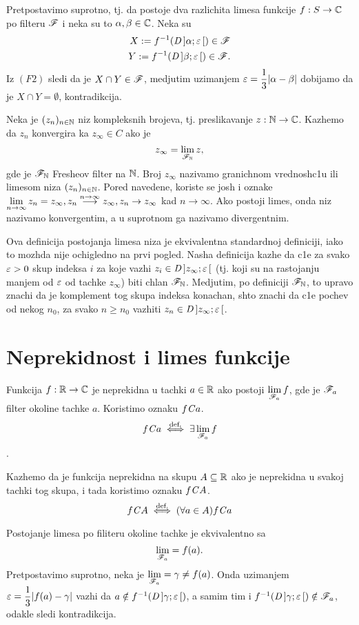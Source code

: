 \documentclass[../main_og.tex]{subfiles}
\begin{document}
    \dok Pretpostavimo suprotno, tj. da postoje dva razlichita limesa funkcije $f:S\to \mathbb{C}$ po filteru $\mathscr{F}$  i neka su to $\alpha, \beta \in \mathbb{C}$. Neka su 
    \begin{align*}
        X:= f^{-1}(\mathit{D}\,]\alpha;\varepsilon\,[) \in \mathscr{F}\\
        Y:= f^{-1}(\mathit{D}\,]\beta;\varepsilon\,[) \in \mathscr{F}.
    \end{align*}
    Iz $(F2)$ sledi da je $X\cap Y\in \mathscr{F}$, medjutim uzimanjem $\varepsilon=\dfrac{1}{3}|\alpha-\beta|$ dobijamo da je $X\cap Y=\emptyset$, kontradikcija.

    Neka je $(z_n)_{n\in \mathbb{N}}$ niz kompleksnih brojeva, tj. preslikavanje $z:\mathbb{N} \to \mathbb{C}$. Kazhemo da $z_n$ konvergira ka $z_\infty\in C$ ako je \[z_\infty=\lim_{\mathscr{F}_{\mathbb{N}}}z,\] gde je $\mathscr{F}_{\mathbb{N}}$ Fresheov filter na $\mathbb{N}$. Broj $z_\infty$ nazivamo granichnom vrednosh\-c1u ili limesom niza  $(z_n)_{n\in \mathbb{N}}$. Pored navedene, koriste se josh i oznake $\displaystyle{\lim_{n\to\infty}z_n=z_\infty,z_n\overset{n\to\infty}{\longrightarrow}z_\infty,z_n\to z_\infty}$ kad $n\to \infty$. Ako postoji limes, onda niz nazivamo konvergentim, a u suprotnom ga nazivamo divergentnim.

    Ova definicija postojanja limesa niza je ekvivalentna standardnoj definiciji, iako to mozhda nije ochigledno na prvi pogled. Nasha definicija kazhe da c1e za svako $\varepsilon>0$ skup indeksa $i$ za koje vazhi $z_i\in \mathit{D}\,]z_\infty;\varepsilon\,[$ (tj. koji su na rastojanju manjem od $\varepsilon$ od tachke $z_\infty$) biti chlan $\mathscr{F}_{\mathbb{N}}$. Medjutim, po definiciji $\mathscr{F}_{\mathbb{N}}$, to upravo znachi da je komplement tog skupa indeksa konachan, shto znachi da c1e pochev od nekog $n_0$, za svako $n\geq n_0$ vazhiti $z_n\in \mathit{D}\,]z_\infty;\varepsilon\,[$.

\section{Neprekidnost i limes funkcije}
    \begin{de}\label{defnepr}
     Funkcija $f:\mathbb{R} \to \mathbb{C}$ je neprekidna u tachki $a\in \mathbb{R}$ ako postoji $\displaystyle{\lim_{\mathscr{F}_a}f}$, gde je $\mathscr{F}_a$ filter okoline tachke $a$. Koristimo oznaku $f \mathit{C} a$.\[f\mathit{C} a \overset{\text{def.}}{\iff} \exists \lim_{\mathscr{F}_a}f\].
        \end{de}
    Kazhemo da je funkcija neprekidna na skupu $A\subseteq \mathbb{R}$ ako je neprekidna u svakoj tachki tog skupa, i tada koristimo oznaku $f\mathit{C} A$.
    \[f\mathit{C} A \overset{\text{def.}}{\iff} (\forall a\in A) f\mathit{C} a\]

    \nap Postojanje limesa po filiteru okoline tachke je ekvivalentno sa $$\lim_{\mathscr{F}_a}=f(a).$$ Pretpostavimo suprotno, neka je $\displaystyle{\lim_{\mathscr{F}_a}=\gamma\neq f(a)}$. Onda uzimanjem $\varepsilon=\dfrac{1}{3}|f(a)-\gamma|$ vazhi da $a\notin f^{-1}(\mathit{D}\,]\gamma;\varepsilon\,[)$, a samim tim i $ f^{-1}(\mathit{D}\,]\gamma;\varepsilon\,[)\notin \mathscr{F}_a$, odakle sledi kontradikcija.
\end{document}
